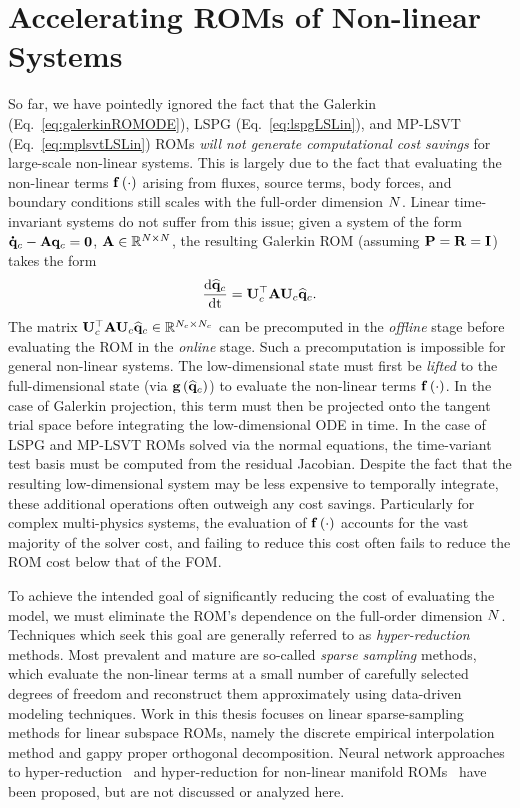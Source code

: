 \section{Accelerating ROMs of Non-linear Systems}\label{sec:hyperreduction}

So far, we have pointedly ignored the fact that the Galerkin (Eq.~\ref{eq:galerkinROMODE}), LSPG (Eq.~\ref{eq:lspgLSLin}), and MP-LSVT (Eq.~\ref{eq:mplsvtLSLin}) ROMs \textit{will not generate computational cost savings} for large-scale non-linear systems. This is largely due to the fact that evaluating the non-linear terms $\mathbf{f} \left(\cdot\right)$ arising from fluxes, source terms, body forces, and boundary conditions still scales with the full-order dimension $N$. Linear time-invariant systems do not suffer from this issue; given a system of the form $\accentset{\mbox{\large\bfseries .}}{\mathbf{q}}_{c} - \mathbf{A} \mathbf{q}_{c} = \mathbf{0}$, $\mathbf{A} \in \mathbb{R}^{N \times N}$, the resulting Galerkin ROM (assuming $\consScale = \resScale = \identMat$) takes the form
%
\begin{equation}
    \ode{\consVecCoef}{\timeVar} = \consTrial^\top \dummyMat \consTrial \consVecCoef.
\end{equation}
%
The matrix $\consTrial^\top \dummyMat \consTrial \consVecCoef \inRTwo{\numConsModes}{\numConsModes}$ can be precomputed in the \textit{offline} stage before evaluating the ROM in the \textit{online} stage. Such a precomputation is impossible for general non-linear systems. The low-dimensional state must first be \textit{lifted} to the full-dimensional state (via $\mathbf{g} \left(\mathbf{\widehat{q}}_{c}\right)$) to evaluate the non-linear terms $\mathbf{f} \left(\cdot\right)$. In the case of Galerkin projection, this term must then be projected onto the tangent trial space before integrating the low-dimensional ODE in time. In the case of LSPG and MP-LSVT ROMs solved via the normal equations, the time-variant test basis must be computed from the residual Jacobian. Despite the fact that the resulting low-dimensional system may be less expensive to temporally integrate, these additional operations often outweigh any cost savings. Particularly for complex multi-physics systems, the evaluation of $\mathbf{f} \left(\cdot\right)$ accounts for the vast majority of the solver cost, and failing to reduce this cost often fails to reduce the ROM cost below that of the FOM.

To achieve the intended goal of significantly reducing the cost of evaluating the model, we must eliminate the ROM's dependence on the full-order dimension $N$. Techniques which seek this goal are generally referred to as \textit{hyper-reduction} methods. Most prevalent and mature are so-called \textit{sparse sampling} methods, which evaluate the non-linear terms at a small number of carefully selected degrees of freedom and reconstruct them approximately using data-driven modeling techniques. Work in this thesis focuses on linear sparse-sampling methods for linear subspace ROMs, namely the discrete empirical interpolation method and gappy proper orthogonal decomposition. Neural network approaches to hyper-reduction~\cite{nnHyperRed} and hyper-reduction for non-linear manifold ROMs~\cite{Kim2022} have been proposed, but are not discussed or analyzed here.

